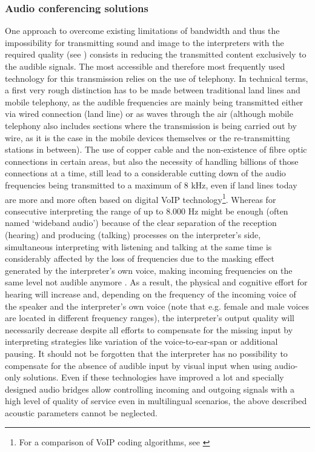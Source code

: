 \documentclass[output=paper]{langsci/langscibook}
\begin{document}
\subsubsection{Audio conferencing solutions}
\label{sub:ziegler:4.3}
One approach to overcome existing limitations of bandwidth and thus the impossibility for transmitting sound and image to the interpreters with the required quality (see ) consists in reducing the transmitted content exclusively to the audible signals. The most accessible and therefore most frequently used technology for this transmission relies on the use of telephony. In technical terms, a first very rough distinction has to be made between traditional land lines and mobile telephony, as the audible frequencies are mainly being transmitted either via wired connection (land line) or as waves through the air (although mobile telephony also includes sections where the transmission is being carried out by wire, as it is the case in the mobile devices themselves or the re-transmitting stations in between). The use of copper cable and the non-existence of fibre optic connections in certain areas, but also the necessity of handling billions of those connections at a time, still lead to a considerable cutting down of the audio frequencies being transmitted to a maximum of 8 kHz, even if land lines today are more and more often based on digital VoIP technology\footnote{For a comparison of VoIP coding algorithms, see \citet{Singh2016}}. Whereas for consecutive interpreting the range of up to 8.000 Hz might be enough (often named ‘wideband audio’) because of the clear separation of the reception (hearing) and producing (talking) processes on the interpreter’s side, simultaneous interpreting with listening and talking at the same time is considerably affected by the loss of frequencies due to the masking effect generated by the interpreter’s own voice, making incoming frequencies on the same level not audible anymore \citep{Jumpelt1984}. As a result, the physical and cognitive effort for hearing will increase and, depending on the frequency of the incoming voice of the speaker and the interpreter’s own voice (note that e.g. female and male voices are located in different frequency ranges), the interpreter’s output quality will necessarily decrease despite all efforts to compensate for the missing input by interpreting strategies like variation of the voice-to-ear-span or additional pausing. It should not be forgotten that the interpreter has no possibility to compensate for the absence of audible input by visual input when using audio-only solutions. Even if these technologies have improved a lot and specially designed audio bridges allow controlling incoming and outgoing signals with a high level of quality of service even in multilingual scenarios, the above described acoustic parameters cannot be neglected.
\end{document}
